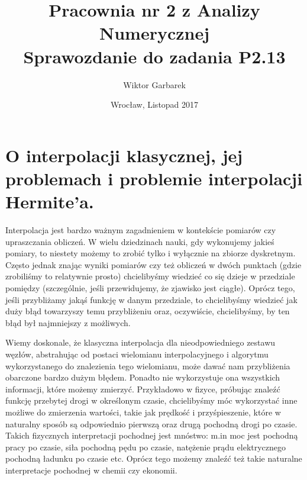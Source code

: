 \documentclass[10pt,wide]{mwart}
\theoremstyle{definition}
\begin{document}
\title{\textbf{Pracownia nr 2 z Analizy Numerycznej}\\
Sprawozdanie do zadania \textbf{P2.13}}
\author{Wiktor Garbarek}
\date{Wrocław, Listopad 2017}

\maketitle
 \thispagestyle{empty}
 \section{O interpolacji klasycznej, jej problemach i problemie interpolacji Hermite'a.}
 Interpolacja jest bardzo ważnym zagadnieniem w kontekście pomiarów czy upraszczania obliczeń. W wielu dziedzinach nauki, gdy wykonujemy jakieś pomiary,
 to niestety możemy to zrobić tylko i wyłącznie na zbiorze dyskretnym. Często jednak znając wyniki pomiarów czy też obliczeń w dwóch punktach
 (gdzie zrobiliśmy to relatywnie prosto) chcielibyśmy wiedzieć co się dzieje w przedziale pomiędzy (szczególnie, jeśli przewidujemy, że zjawisko jest ciągłe).
 Oprócz tego, jeśli przybliżamy jakąś funkcję w danym przedziale, to chcielibyśmy wiedzieć jak duży błąd towarzyszy temu przybliżeniu oraz, oczywiście, chcielibyśmy, by ten błąd był najmniejszy z możliwych.

 Wiemy doskonale, że klasyczna interpolacja dla nieodpowiedniego zestawu węzłów, abstrahując od postaci wielomianu interpolacyjnego i algorytmu wykorzystanego do znalezienia tego wielomianu, może dawać nam przybliżenia obarczone bardzo dużym błędem.
 Ponadto nie wykorzystuje ona wszystkich informacji, które możemy zmierzyć. Przykładowo w fizyce,
 próbując znaleźć funkcję przebytej drogi w określonym czasie, chcielibyśmy móc wykorzystać inne możliwe do zmierzenia wartości,
 takie jak prędkość i przyśpieszenie, które w naturalny sposób są odpowiednio pierwszą oraz drugą pochodną drogi po czasie.
 Takich fizycznych interpretacji pochodnej jest mnóstwo: m.in moc jest pochodną pracy po czasie, siła pochodną pędu po czasie, natężenie prądu elektrycznego pochodną ładunku po czasie etc.
 Oprócz tego możemy znaleźć też takie naturalne interpretacje pochodnej w chemii czy ekonomii.
\end{document}
